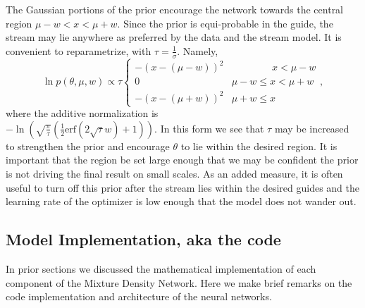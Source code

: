 \documentclass[twocolumn]{aastex631}
\newcommand{\pdf}{p}
\begin{document}
            The Gaussian portions of the prior encourage the network towards the
            central region $\mu - w < x < \mu + w$. Since the prior is
            equi-probable in the guide, the stream may lie anywhere as preferred
            by the data and the stream model.  It is convenient to
            reparametrize, with $\tau = \frac{1}{\sigma}$. Namely,
            \begin{equation}
                \ln \pdf(\theta,\mu,w) \propto \tau
                \begin{cases} 
                    -\left(x-(\mu-w)\right)^2 & \phantom{\mu - w <}\ x < \mu - w \\
                    0 & \mu - w \leq x < \mu + w \\
                    -\left(x-(\mu+w)\right)^2 & \mu + w \leq x
                \end{cases},
            \end{equation}
            where the additive normalization is
            \\
            $-\ln\left(\sqrt{\frac{\pi}{\tau}}
            \left(\frac{1}{2}\text{erf}\left(2 \sqrt{\tau }
            w\right)+1\right)\right)$.  In this form we see that $\tau$ may be
            increased to strengthen the prior and encourage $\theta$ to lie
            within the desired region. It is important that the region be set
            large enough that we may be confident the prior is not driving the
            final result on small scales. As an added measure, it is often
            useful to turn off this prior after the stream lies within the
            desired guides and the learning rate of the optimizer is low enough
            that the model does not wander out.



    \vspace{5pt}
    \subsection{Model Implementation, aka the code} \label{sub:methods:model_implementation}

        In prior sections we discussed the mathematical implementation of each
        component of the Mixture Density Network. Here we make brief remarks on
        the code implementation and architecture of the neural networks.
\end{document}
